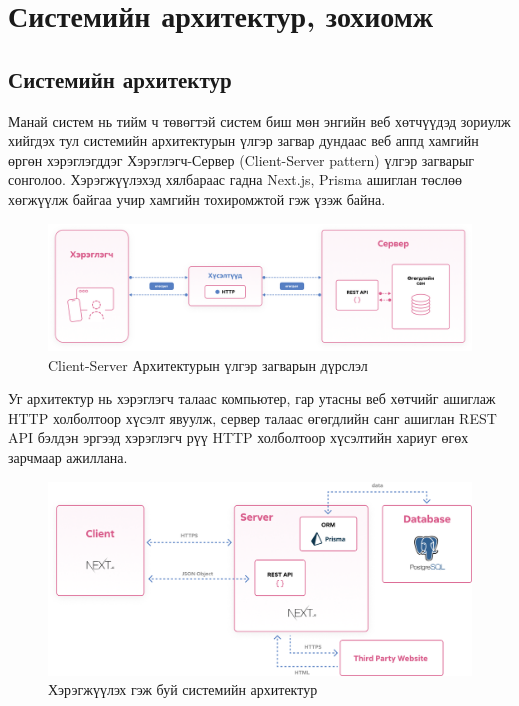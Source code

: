 \chapter{Системийн архитектур, зохиомж}

\section{Системийн архитектур}

Манай систем нь тийм ч төвөгтэй систем биш мөн энгийн веб хөтчүүдэд зориулж хийгдэх тул системийн архитектурын үлгэр загвар дундаас веб аппд хамгийн өргөн хэрэглэгддэг Хэрэглэгч-Сервер (Client-Server pattern) үлгэр загварыг сонголоо. Хэрэгжүүлэхэд хялбараас гадна Next.js, Prisma ашиглан төслөө хөгжүүлж байгаа учир хамгийн тохиромжтой гэж үзэж байна.

\begin{figure}[h]
	\centering
	\includegraphics[width=15cm]{images/architecture.png}
	\caption{Client-Server Архитектурын үлгэр загварын дүрслэл}
	\label{fig:architecture}
\end{figure}

Уг архитектур нь хэрэглэгч талаас компьютер, гар утасны веб хөтчийг ашиглаж HTTP холболтоор хүсэлт явуулж, сервер талаас өгөгдлийн санг ашиглан REST API бэлдэн эргээд хэрэглэгч рүү HTTP холболтоор хүсэлтийн хариуг өгөх зарчмаар ажиллана.

\clearpage

\begin{figure}[h]
	\centering
	\includegraphics[width=15cm]{images/imp-architecture.png}
	\caption{Хэрэгжүүлэх гэж буй системийн архитектур}
	\label{fig:imp-architecture}
\end{figure}

